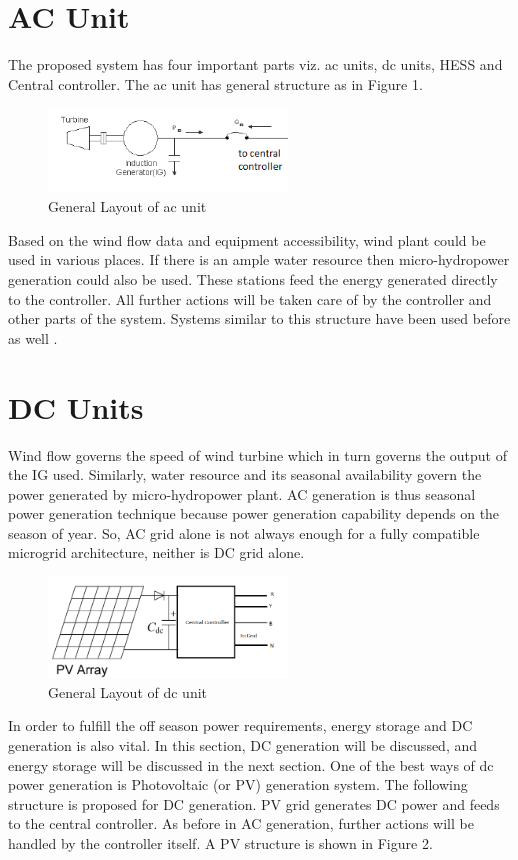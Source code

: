 \documentclass[journal,twoside]{IEEEtran}
\begin{document}
\section{AC Unit}
The proposed system has four important parts viz. ac units, dc units, HESS and Central controller. The ac unit has general structure as in Figure 1.
\begin{figure}[!ht]
\centering
\includegraphics[width=2.5in]{1}
\caption{General Layout of ac unit}
\end{figure}
Based on the wind flow data and equipment accessibility, wind plant could be used in various places. If there is an ample water resource then micro-hydropower generation could also be used. These stations feed the energy generated directly to the controller. All further actions will be taken care of by the controller and other parts of the system. Systems similar to this structure have been used before as well \cite{Piagi2006, Liu2015, Jabri2015, Moghadam2015}.

\section{DC Units}
Wind flow governs the speed of wind turbine which in turn governs the output of the IG used. Similarly, water resource and its seasonal availability govern the power generated by micro-hydropower plant. AC generation is thus seasonal power generation technique because power generation capability depends on the season of year. So, AC grid alone is not always enough for a fully compatible microgrid architecture, neither is DC grid alone. 
\begin{figure}[!t]
\centering
\includegraphics[width=2.5in]{2}
\caption{General Layout of dc unit}
\label{f2}
\end{figure}In order to fulfill the off season power requirements, energy storage and DC generation is also vital. In this section, DC generation will be discussed, and energy storage will be discussed in the next section. One of the best ways of dc power generation is Photovoltaic (or PV) generation system. The following structure is proposed for DC generation. PV grid generates DC power and feeds to the central controller. As before in AC generation, further actions will be handled by the controller itself. A PV structure is shown in Figure 2.
\end{document}
